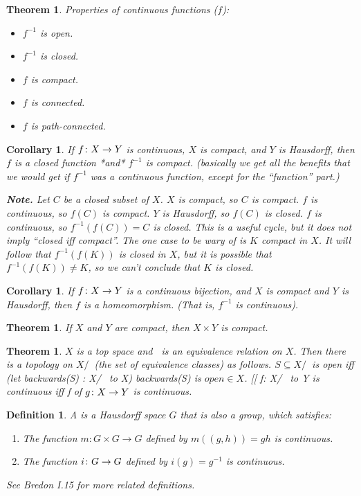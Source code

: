 \documentclass[11pt]{amsbook}
\theoremstyle{mystyle} %
\newtheorem{thrm}[thm]{Theorem}
\newtheorem{defi}[thm]{Definition}
\newtheorem{coro}[thm]{Corollary}
\numberwithin{thm}{section}
\begin{document}
\begin{thrm}
	Properties of continuous functions ($f$):
	\begin{itemize}
		\item $f^{-1}$ is open.
		\item $f^{-1}$ is closed.
		\item $f$ is compact.
		\item $f$ is connected.
		\item $f$ is path-connected.
	\end{itemize}
\end{thrm}
\begin{coro}
	If $f \colon X \to Y$ is continuous, $X$ is compact, and $Y$ is Hausdorff, then $f$ is a closed function *and* $f^{-1}$ is compact.  (basically we get all the benefits that we would get if $f^{-1}$ was a continuous function, except for the ``function'' part.)

	\textbf{Note.} Let $C$ be a closed subset of $X$.  $X$ is compact, so $C$ is compact.  $f$ is continuous, so $f(C)$ is compact.  $Y$ is Hausdorff, so $f(C)$ is closed.  $f$ is continuous, so $f^{-1}(f(C)) = C$ is closed.  This is a useful cycle, but it does not imply ``closed iff compact''.  The one case to be wary of is $K$ compact in $X$.  It will follow that $f^{-1}(f(K))$ is closed in $X$, but it is possible that $f^{-1}(f(K)) \neq K$, so we can't conclude that $K$ is closed.
\end{coro}
\begin{coro}
	If $f \colon X \to Y$ is a continuous bijection, and $X$ is compact and $Y$ is Hausdorff, then $f$ is a homeomorphism. (That is, $f^{-1}$ is continuous).
\end{coro}
\begin{thrm}
	If $X$ and $Y$ are compact, then $X \times Y$ is compact.
\end{thrm}
\begin{thrm}
	$X$ is a top space and $~$ is an equivalence relation on $X$.  Then there is a topology on $X/~$ (the set of equivalence classes) as follows.  $S \subseteq X/~$ is open iff (let backwards(S) : X/~ to X) backwards(S) is $open \in X$.  [[ f: X/~ to Y is continuous iff f of $g\colon X \to Y$ is continuous.
\end{thrm}
\begin{defi}
	A  is a Hausdorff space $G$ that is also a group, which satisfies:
	\begin{enumerate}
		\item The function $m : G \times G \to G$ defined by $m((g,h)) = gh$ is continuous.
		\item The function $i \colon G \to G$ defined by $i(g) = g^{-1}$ is continuous.
	\end{enumerate}
	See Bredon I.15 for more related definitions.
\end{defi}
\end{document}
